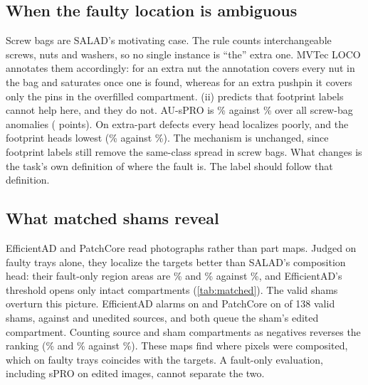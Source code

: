 \subsection{When the faulty location is ambiguous}
\label{sec:ambiguous}
Screw bags are SALAD's motivating case. The rule counts interchangeable screws, nuts and washers, so no single instance is ``the'' extra one. MVTec LOCO annotates them accordingly: for an extra nut the annotation covers every nut in the bag and saturates once one is found, whereas for an extra pushpin it covers only the pins in the overfilled compartment. (ii) predicts that footprint labels cannot help here, and they do not. AU-sPRO is \sbFP\% against \sbCW\% over all screw-bag anomalies (\sbGain{} points). On extra-part defects every head localizes poorly, and the footprint heads lowest (\sbExtraFP\% against \sbExtraCW\%). The mechanism is unchanged, since footprint labels still remove the same-class spread in screw bags. What changes is the task's own definition of where the fault is. The label should follow that definition.

\subsection{What matched shams reveal}
\label{sec:system}
EfficientAD and PatchCore read photographs rather than part maps. Judged on faulty trays alone, they localize the targets better than SALAD's composition head: their fault-only region areas are \eadRegFault\% and \pcRegFault\% against \relRegFault\%, and EfficientAD's threshold opens only \eadThrW{} intact compartments (\cref{tab:matched}). The valid shams overturn this picture. EfficientAD alarms on \eadSham{} and PatchCore on \pcSham{} of 138 valid shams, against \eadSrc{} and \pcSrc{} unedited sources, and both queue the sham's edited compartment. Counting source and sham compartments as negatives reverses the ranking (\eadRegAll\% and \pcRegAll\% against \relRegAll\%). These maps find where pixels were composited, which on faulty trays coincides with the targets. A fault-only evaluation, including sPRO on edited images, cannot separate the two.

\begin{table}[t]
\centering
\caption{SALAD's full system on matched pushpin trays (re-segmented path; alarms out of 138). Native: logical AUROC (\%). The validation cutoff uses SALAD's validation-based normalization with our 10\% split-conformal cutoff; the normal-test cutoff is refit on one half of the unedited test trays and applied to the other.}
\label{tab:system}
\small\setlength{\tabcolsep}{1.9pt}

\end{table}

